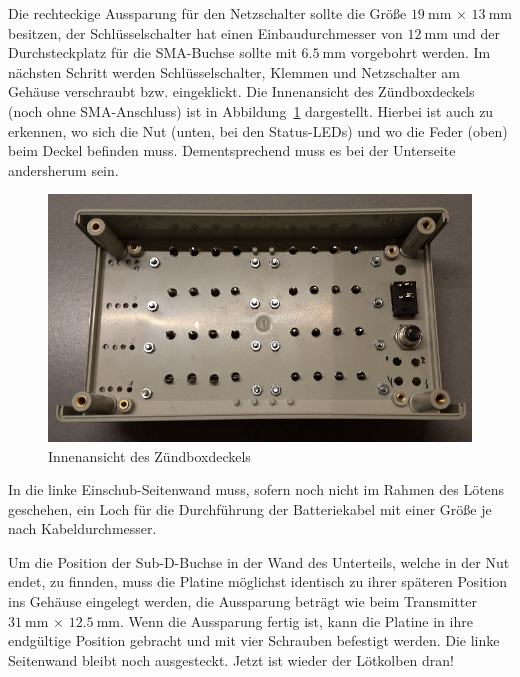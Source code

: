 \documentclass[paper=a4, parskip, numbers=noenddot, toc=listof, headsepline]{scrbook}
\begin{document}
			  Die rechteckige Aussparung für den Netzschalter sollte die Größe $\SI{19}{\milli\metre}\,\times\,\SI{13}{\milli\metre}$ besitzen, der Schlüsselschalter hat einen Einbaudurchmesser von $\SI{12}{\milli\metre}$ und der Durchsteckplatz für die SMA-Buchse sollte mit $\SI{6,5}{\milli\metre}$ vorgebohrt werden. Im nächsten Schritt werden Schlüsselschalter, Klemmen und Netzschalter am Gehäuse verschraubt bzw. eingeklickt. Die Innenansicht des Zündboxdeckels (noch ohne SMA-Anschluss) ist in Abbildung~\ref{fig:zuendboxdeckel} dargestellt. Hierbei ist auch zu erkennen, wo sich die Nut (unten, bei den Status-LEDs) und wo die Feder (oben) beim Deckel befinden muss. Dementsprechend muss es bei der Unterseite andersherum sein.

			  \begin{figure}
				  \centering
				  \includegraphics[width=\textwidth]{bilder/zuendboxdeckel}
				  \caption{Innenansicht des Zündboxdeckels}
				  \label{fig:zuendboxdeckel}
			  \end{figure}

			  In die linke Einschub-Seitenwand muss, sofern noch nicht im Rahmen des Lötens geschehen, ein Loch für die Durchführung der Batteriekabel mit einer Größe je nach Kabeldurchmesser.

			  Um die Position der Sub-D-Buchse in der Wand des Unterteils, welche in der Nut endet, zu finnden, muss die Platine möglichst identisch zu ihrer späteren Position ins Gehäuse eingelegt werden, die Aussparung beträgt wie beim Transmitter $\SI{31}{\milli\metre}\,\times\,\SI{12,5}{\milli\metre}$. Wenn die Aussparung fertig ist, kann die Platine in ihre endgültige Position gebracht und mit vier Schrauben befestigt werden. Die linke Seitenwand bleibt noch ausgesteckt. Jetzt ist wieder der Lötkolben dran!
\end{document}
